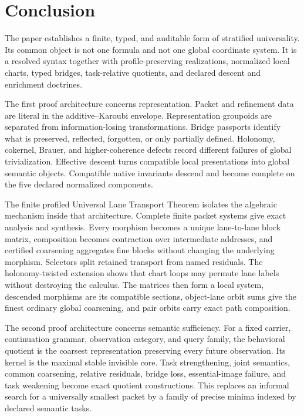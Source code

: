 \section{Conclusion}
\label{sec:publication-conclusion}

The paper establishes a finite, typed, and auditable form of stratified universality.  Its common object is not one formula and not one global coordinate system.  It is a resolved syntax together with profile-preserving realizations, normalized local charts, typed bridges, task-relative quotients, and declared descent and enrichment doctrines.

The first proof architecture concerns representation.  Packet and refinement data are literal in the additive--Karoubi envelope.  Representation groupoids are separated from information-losing transformations.  Bridge passports identify what is preserved, reflected, forgotten, or only partially defined.  Holonomy, cokernel, Brauer, and higher-coherence defects record different failures of global trivialization.  Effective descent turns compatible local presentations into global semantic objects.  Compatible native invariants descend and become complete on the five declared normalized components.

The finite profiled Universal Lane Transport Theorem isolates the algebraic mechanism inside that architecture.  Complete finite packet systems give exact analysis and synthesis.  Every morphism becomes a unique lane-to-lane block matrix, composition becomes contraction over intermediate addresses, and certified coarsening aggregates fine blocks without changing the underlying morphism.  Selectors split retained transport from named residuals.  The holonomy-twisted extension shows that chart loops may permute lane labels without destroying the calculus.  The matrices then form a local system, descended morphisms are its compatible sections, object-lane orbit sums give the finest ordinary global coarsening, and pair orbits carry exact path composition.

The second proof architecture concerns semantic sufficiency.  For a fixed carrier, continuation grammar, observation category, and query family, the behavioral quotient is the coarsest representation preserving every future observation.  Its kernel is the maximal stable invisible core.  Task strengthening, joint semantics, common coarsening, relative residuals, bridge loss, essential-image failure, and task weakening become exact quotient constructions.  This replaces an informal search for a universally smallest packet by a family of precise minima indexed by declared semantic tasks.

